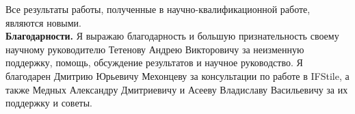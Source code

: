 Все результаты работы, полученные в научно-квалификационной работе, являются новыми.
\\

\textbf{Благодарности.}
Я выражаю благодарность и большую признательность своему научному руководителю Тетенову Андрею Викторовичу за неизменную поддержку, помощь, обсуждение результатов и научное руководство.
Я благодарен Дмитрию Юрьевичу Мехонцеву за консультации по работе в IFStile, а также Медных Александру Дмитриевичу и Асееву Владиславу Васильевичу за их поддержку и советы.